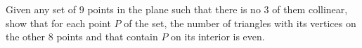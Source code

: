 Given any set of $9$ points in the plane such that there is no $3$ of them collinear, show that for each point $P$ of the set, the number of triangles with its vertices on the other $8$ points and that contain $P$ on its interior is even.